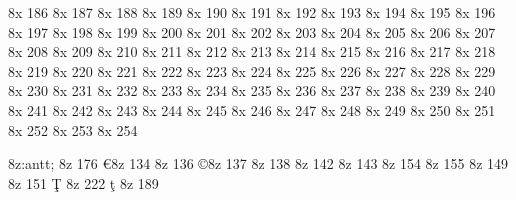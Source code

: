 \characterdef \arrowdbldown   8x   186
\characterdef \arrowdblboth   8x   187
\characterdef \arrowlefttophalf   8x   188
\characterdef \arrowrighttophalf   8x   189
\characterdef \arrowleftbothalf   8x   190
\characterdef \arrowrightbothalf   8x   191
\characterdef \similar   8x   192
\characterdef \asymptoticallyequal   8x   193
\characterdef \union   8x   194
\characterdef \intersection   8x   195
\characterdef \unionmulti   8x   196
\characterdef \unionsq   8x   197
\characterdef \intersectionsq   8x   198
\characterdef \subsetsqequal   8x   199
\characterdef \supersetsqequal   8x   200
\characterdef \openbullet   8x   201
\characterdef \circleminus   8x   202
\characterdef \circleplus   8x   203
\characterdef \circledivide   8x   204
\characterdef \circlemultiply   8x   205
\characterdef \circledot   8x   206
\characterdef \circlecopyrt   8x   207
\characterdef \diamondmath   8x   208
\characterdef \asteriskmath   8x   209
\characterdef \latticetop   8x   210
\characterdef \perpendicular   8x   211
\characterdef \turnstileleft   8x   212
\characterdef \turnstileright   8x   213
\characterdef \floorleft   8x   214
\characterdef \floorright   8x   215
\characterdef \ceilingleft   8x   216
\characterdef \ceilingright   8x   217
\characterdef \textlangle   8x   218
\characterdef \textrangle   8x   219
\characterdef \dblverticalbar   8x   220
\characterdef \arrowupdndbl   8x   221
\characterdef \arrowupdn   8x   222
\characterdef \universal   8x   223
\characterdef \existential   8x   224
\characterdef \wreathproduct   8x   225
\characterdef \club   8x   226
\characterdef \spade   8x   227
\characterdef \heart   8x   228
\characterdef \diamond   8x   229
\characterdef \logicaland   8x   230
\characterdef \logicalor   8x   231
\characterdef \triangle   8x   232
\characterdef \triangleinv   8x   233
\characterdef \triangleright   8x   234
\characterdef \triangleleft   8x   235
\characterdef \proportional   8x   236
\characterdef \arrowhookleft   8x   237
\characterdef \arrowhookright   8x   238
\characterdef \flat   8x   239
\characterdef \vector   8x   240
\characterdef \tie   8x   241
\characterdef \nabla   8x   242
\characterdef \dollarinferior   8x   243
\characterdef \euroinferior   8x   244
\characterdef \sterlinginferior   8x   245
\characterdef \yeninferior   8x   246
\characterdef \centinferior   8x   247
\characterdef \parenleftinferior   8x   248
\characterdef \periodinferior   8x   249
\characterdef \hypheninferior   8x   250
\characterdef \commainferior   8x   251
\characterdef \parenrightinferior   8x   252
\characterdef \trademark   8x   253
\characterdef \estimated   8x   254

\modifydef 8z:antt; {%
   \characterdef \degree      8z  176
   \characterdef \euro        8z  134
   \characterdef \trademark   8z  136
   \characterdef \copyright   8z  137
   \characterdef \registered  8z  138
   \characterdef \flq         8z  142
   \characterdef \frq         8z  143
   \characterdef \clq         8z  154
   \characterdef \crq         8z  155
   \characterdef \longs       8z  149
   \characterdef \florin      8z  151
   \accentdel  \c T      8z  222
   \accentdel  \c t      8z  189   
}








